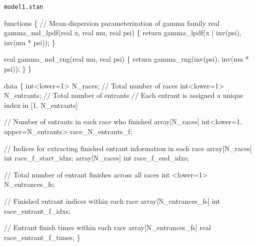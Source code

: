\documentclass[
  letterpaper,
  DIV=11,
  numbers=noendperiod]{scrartcl}
\newenvironment{Shaded}{\begin{snugshade}}{\end{snugshade}}
\newcommand{\CommentTok}[1]{\textcolor[rgb]{0.37,0.37,0.37}{#1}}
\newcommand{\ControlFlowTok}[1]{\textcolor[rgb]{0.00,0.23,0.31}{#1}}
\newcommand{\DataTypeTok}[1]{\textcolor[rgb]{0.68,0.00,0.00}{#1}}
\newcommand{\DecValTok}[1]{\textcolor[rgb]{0.68,0.00,0.00}{#1}}
\newcommand{\KeywordTok}[1]{\textcolor[rgb]{0.00,0.23,0.31}{#1}}
\newcommand{\NormalTok}[1]{\textcolor[rgb]{0.00,0.23,0.31}{#1}}
\begin{document}
\begin{codelisting}

\caption{\texttt{model1.stan}}

\begin{Shaded}
\begin{Highlighting}[]
\KeywordTok{functions}\NormalTok{ \{}
  \CommentTok{// Mean{-}dispersion parameterization of gamma family}
  \DataTypeTok{real}\NormalTok{ gamma\_md\_lpdf(}\DataTypeTok{real}\NormalTok{ x, }\DataTypeTok{real}\NormalTok{ mu, }\DataTypeTok{real}\NormalTok{ psi) \{}
    \ControlFlowTok{return}\NormalTok{ gamma\_lpdf(x | inv(psi), inv(mu * psi));}
\NormalTok{  \}}

  \DataTypeTok{real}\NormalTok{ gamma\_md\_rng(}\DataTypeTok{real}\NormalTok{ mu, }\DataTypeTok{real}\NormalTok{ psi) \{}
    \ControlFlowTok{return}\NormalTok{ gamma\_rng(inv(psi), inv(mu * psi));}
\NormalTok{  \}}
\NormalTok{\}}

\KeywordTok{data}\NormalTok{ \{}
  \DataTypeTok{int}\NormalTok{\textless{}}\KeywordTok{lower}\NormalTok{=}\DecValTok{1}\NormalTok{\textgreater{} N\_races;    }\CommentTok{// Total number of races}
  \DataTypeTok{int}\NormalTok{\textless{}}\KeywordTok{lower}\NormalTok{=}\DecValTok{1}\NormalTok{\textgreater{} N\_entrants; }\CommentTok{// Total number of entrants}
  \CommentTok{// Each entrant is assigned a unique index in [1, N\_entrants]}

  \CommentTok{// Number of entrants in each race who finished}
  \DataTypeTok{array}\NormalTok{[N\_races] }\DataTypeTok{int}\NormalTok{\textless{}}\KeywordTok{lower}\NormalTok{=}\DecValTok{1}\NormalTok{, }\KeywordTok{upper}\NormalTok{=N\_entrants\textgreater{} race\_N\_entrants\_f;}

  \CommentTok{// Indices for extracting finished entrant information in each race}
  \DataTypeTok{array}\NormalTok{[N\_races] }\DataTypeTok{int}\NormalTok{ race\_f\_start\_idxs;}
  \DataTypeTok{array}\NormalTok{[N\_races] }\DataTypeTok{int}\NormalTok{ race\_f\_end\_idxs;}

  \CommentTok{// Total number of entrant finishes across all races}
  \DataTypeTok{int}\NormalTok{ \textless{}}\KeywordTok{lower}\NormalTok{=}\DecValTok{1}\NormalTok{\textgreater{} N\_entrances\_fs;}

  \CommentTok{// Finished entrant indices within each race}
  \DataTypeTok{array}\NormalTok{[N\_entrances\_fs] }\DataTypeTok{int}\NormalTok{ race\_entrant\_f\_idxs;}

  \CommentTok{// Entrant finish times within each race}
  \DataTypeTok{array}\NormalTok{[N\_entrances\_fs] }\DataTypeTok{real}\NormalTok{ race\_entrant\_f\_times;}
\NormalTok{\}}


\end{Highlighting}
\end{Shaded}
\end{codelisting}
\end{document}
